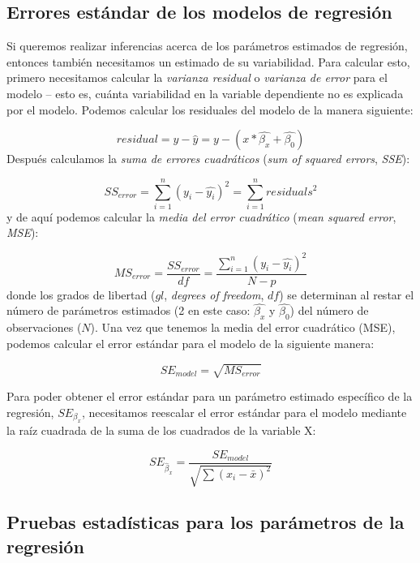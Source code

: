 \documentclass[
  12pt,
]{book}
\begin{document}
\hypertarget{errores-estuxe1ndar-de-los-modelos-de-regresiuxf3n}{%
\subsection{Errores estándar de los modelos de regresión}\label{errores-estuxe1ndar-de-los-modelos-de-regresiuxf3n}}

Si queremos realizar inferencias acerca de los parámetros estimados de regresión, entonces también necesitamos un estimado de su variabilidad. Para calcular esto, primero necesitamos calcular la \emph{varianza residual} o \emph{varianza de error} para el modelo -- esto es, cuánta variabilidad en la variable dependiente no es explicada por el modelo. Podemos calcular los residuales del modelo de la manera siguiente:

\[
residual = y - \hat{y} = y - (x*\hat{\beta_x} + \hat{\beta_0})
\]
Después calculamos la \emph{suma de errores cuadráticos} (\emph{sum of squared errors}, \emph{SSE}):

\[
SS_{error} = \sum_{i=1}^n{(y_i - \hat{y_i})^2} = \sum_{i=1}^n{residuals^2}
\]
y de aquí podemos calcular la \emph{media del error cuadrático} (\emph{mean squared error}, \emph{MSE}):

\[
MS_{error} = \frac{SS_{error}}{df} = \frac{\sum_{i=1}^n{(y_i - \hat{y_i})^2} }{N - p}
\]
donde los grados de libertad (\(gl\), \emph{degrees of freedom}, \(df\)) se determinan al restar el número de parámetros estimados (2 en este caso: \(\hat{\beta_x}\) y \(\hat{\beta_0}\)) del número de observaciones (\(N\)). Una vez que tenemos la media del error cuadrático (MSE), podemos calcular el error estándar para el modelo de la siguiente manera:

\[
SE_{model} = \sqrt{MS_{error}}
\]

Para poder obtener el error estándar para un parámetro estimado específico de la regresión, \(SE_{\beta_x}\), necesitamos reescalar el error estándar para el modelo mediante la raíz cuadrada de la suma de los cuadrados de la variable X:

\[
SE_{\hat{\beta}_x} = \frac{SE_{model}}{\sqrt{{\sum{(x_i - \bar{x})^2}}}}
\]

\hypertarget{pruebas-estaduxedsticas-para-los-paruxe1metros-de-la-regresiuxf3n}{%
\subsection{Pruebas estadísticas para los parámetros de la regresión}\label{pruebas-estaduxedsticas-para-los-paruxe1metros-de-la-regresiuxf3n}}
\end{document}
